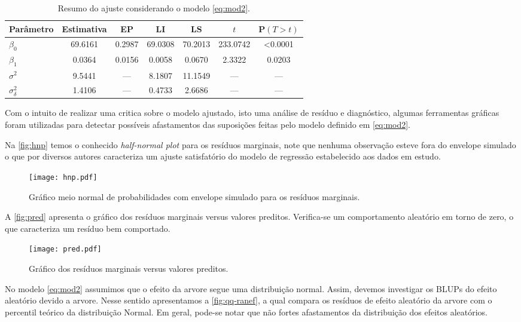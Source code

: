 \documentclass[12pt,a4paper,final]{article}
\begin{document}
\begin{table}[H]
	\centering
	\caption{Resumo do ajuste considerando o modelo \eqref{eq:mod2}.}
	\label{tab:res}
	\onehalfspacing
	\begin{tabular}{lcccccc}\toprule
		Parâmetro  & Estimativa & EP     & LI     & LS         & $t$ & P$(T > t)$  \\\midrule
		$\beta_0$  & 69.6161   & 0.2987  &69.0308 & 70.2013 & 233.0742  &  <0.0001 \\
		$\beta_1$  & 0.0364    & 0.0156  & 0.0058 & 0.0670   & 2.3322 & 0.0203 \\
		$\sigma^2$ & 9.5441    & ---     &  8.1807 & 11.1549 & --- & --- \\
		$\sigma^2_\delta$ & 1.4106 &---   &  0.4733& 2.6686& --- & --- \\\bottomrule
	\end{tabular}
\end{table}
               
Com o intuito de realizar uma critica sobre o modelo ajustado, isto uma análise de resíduo e diagnóstico, 
algumas ferramentas gráficas foram utilizadas para detectar possíveis afastamentos das suposições feitas pelo modelo
definido em \eqref{eq:mod2}. 

Na \autoref{fig:hnp} temos o conhecido \emph{half-normal plot} para os resíduos marginais, note que nenhuma observação
esteve fora do envelope simulado o que por diversos autores caracteriza um ajuste satisfatório do modelo de regressão estabelecido aos dados em estudo.
\begin{figure}[H]
	\centering
	\texttt{[image: hnp.pdf]}
	\caption{Gráfico meio normal de probabilidades com envelope simulado para os resíduos marginais.}
	\label{fig:hnp}
\end{figure}

\newpage
A \autoref{fig:pred} apresenta o gráfico dos resíduos marginais versus valores preditos. Verifica-se um 
comportamento aleatório em torno de zero, o que caracteriza um resíduo bem comportado.

\begin{figure}[H]
	\centering
	\texttt{[image: pred.pdf]}
	\caption{Gráfico dos resíduos marginais versus valores preditos.}
	\label{fig:pred}
\end{figure}

No modelo \eqref{eq:mod2} assumimos que o efeito da arvore segue uma distribuição normal. Assim, devemos investigar
os BLUPs do efeito aleatório devido a arvore. Nesse sentido apresentamos a \autoref{fig:qq-ranef}, a qual compara
os resíduos de efeito aleatório da arvore com o percentil teórico da distribuição Normal. Em geral, pode-se notar
que não fortes afastamentos da distribuição dos efeitos aleatórios.
\end{document}
